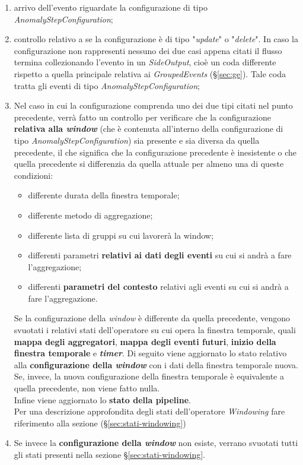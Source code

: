 \begin{enumerate}
	\item{arrivo dell'evento riguardate la configurazione di tipo \textit{AnomalyStepConfiguration};}
	\item{controllo relativo a se la configurazione è di tipo "\textit{update}" o "\textit{delete}". In caso la configurazione non rappresenti nessuno dei due casi appena citati il flusso termina collezionando l'evento in un \textit{SideOutput}, cioè un coda differente rispetto a quella principale relativa ai \textit{GroupedEvents} (\S\ref{sec:ge}). Tale coda tratta gli eventi di tipo \textit{AnomalyStepConfiguration};}
	\item{Nel caso in cui la configurazione comprenda uno dei due tipi citati nel punto precedente, verrà fatto un controllo per verificare che la configurazione \textbf{relativa alla \textit{window}} (che è contenuta all'interno della configurazione di tipo \textit{AnomalyStepConfiguration}) sia presente e sia diversa da quella precedente, il che significa che la configurazione precedente è inesistente o che quella precedente si differenzia da quella attuale per almeno una di queste condizioni:
	\begin{itemize}
		\item{differente durata della finestra temporale;}
		\item{differente metodo di aggregazione;}
		\item{differente lista di gruppi su cui lavorerà la window;}
		\item{differenti parametri \textbf{relativi ai dati degli eventi} su cui si andrà a fare l'aggregazione;}
		\item{differenti \textbf{parametri del contesto} relativi agli eventi su cui si andrà a fare l'aggregazione.}
	\end{itemize}
	
Se la configurazione della \textit{window} è differente da quella precedente, vengono svuotati i relativi stati dell'operatore su cui opera la finestra temporale, quali \textbf{mappa degli aggregatori}, \textbf{mappa degli eventi futuri}, \textbf{inizio della finestra temporale} e \textbf{\textit{timer}}. Di seguito viene aggiornato lo stato relativo alla \textbf{configurazione della \textit{window}} con i dati della finestra temporale nuova.\\
Se, invece, la nuova configurazione della finestra temporale è equivalente a quella precedente, non viene fatto nulla.\\
Infine viene aggiornato lo \textbf{stato della \gls{pipeline}}.\\
Per una descrizione approfondita degli stati dell'operatore \textit{Windowing} fare riferimento alla sezione (\S\ref{sec:stati-windowing})
}
\item{Se invece la \textbf{configurazione della \textit{window}} non esiste, verrano svuotati tutti gli stati presenti nella sezione \S\ref{sec:stati-windowing}.}
\end{enumerate}

